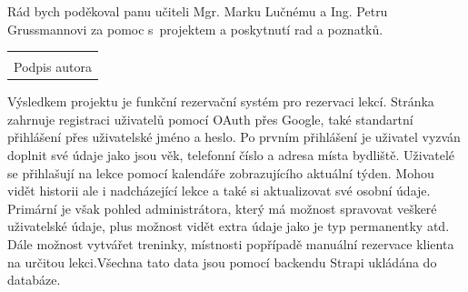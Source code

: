 \documentclass[12pt, a4paper,
openright
]{report}
\newcommand\datumOdevzdani{1. 1. 2025} %
\begin{document}
\clearpage %
	

	
	\noindent Rád bych poděkoval panu učiteli Mgr. Marku Lučnému a Ing. Petru Grussmannovi za pomoc s~projektem a poskytnutí rad a poznatků.
	
	\vspace*{0.7\textheight} %

	\vfill
	\noindent{V Opavě \datumOdevzdani\\}
	\noindent
	\begin{minipage}{\linewidth}
		\hspace{9.5cm} 
		\begin{tabular}{@{}p{6cm}@{}}
			\dotfill \\
			Podpis autora
		\end{tabular}
	\end{minipage}
	
	


	\noindent Výsledkem projektu je funkční rezervační systém pro rezervaci lekcí. Stránka zahrnuje registraci uživatelů pomocí OAuth přes Google, také standartní přihlášení přes uživatelské jméno a heslo. Po prvním přihlášení je uživatel vyzván doplnit své údaje jako jsou věk, telefonní číslo a adresa místa bydliště. Uživatelé se přihlašují na lekce pomocí kalendáře zobrazujícího aktuální týden. Mohou vidět historii ale i nadcházející lekce a také si aktualizovat své osobní údaje. Primární je však pohled administrátora, který má možnost spravovat veškeré uživatelské údaje, plus možnost vidět extra údaje jako je typ permanentky atd. Dále možnost vytvářet treninky, místnosti popřípadě manuální rezervace klienta na určitou lekci.Všechna tato data jsou pomocí backendu Strapi ukládána do databáze.\\
	
\end{document}
